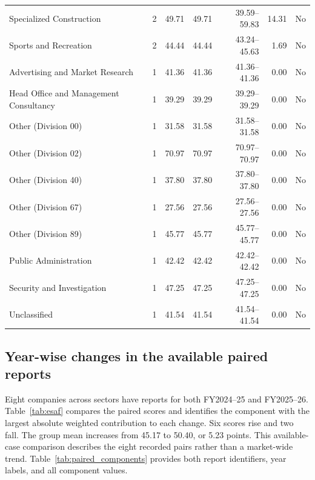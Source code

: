 {\begin{longtable}{@{}L{6.0cm}rrrrrr@{}}
Specialized Construction & 2 & 49.71 & 49.71 & 39.59--59.83 & 14.31 & No \\
Sports and Recreation & 2 & 44.44 & 44.44 & 43.24--45.63 & 1.69 & No \\
Advertising and Market Research & 1 & 41.36 & 41.36 & 41.36--41.36 & 0.00 & No \\
Head Office and Management Consultancy & 1 & 39.29 & 39.29 & 39.29--39.29 & 0.00 & No \\
Other (Division 00) & 1 & 31.58 & 31.58 & 31.58--31.58 & 0.00 & No \\
Other (Division 02) & 1 & 70.97 & 70.97 & 70.97--70.97 & 0.00 & No \\
Other (Division 40) & 1 & 37.80 & 37.80 & 37.80--37.80 & 0.00 & No \\
Other (Division 67) & 1 & 27.56 & 27.56 & 27.56--27.56 & 0.00 & No \\
Other (Division 89) & 1 & 45.77 & 45.77 & 45.77--45.77 & 0.00 & No \\
Public Administration & 1 & 42.42 & 42.42 & 42.42--42.42 & 0.00 & No \\
Security and Investigation & 1 & 47.25 & 47.25 & 47.25--47.25 & 0.00 & No \\
Unclassified & 1 & 41.54 & 41.54 & 41.54--41.54 & 0.00 & No \\
\end{longtable}}

\clearpage

\subsection{Year-wise changes in the available paired reports}
\label{sec:yearwise}

Eight companies across sectors have reports for both FY2024--25 and FY2025--26. Table~\ref{tab:esaf} compares the paired scores and identifies the component with the largest absolute weighted contribution to each change. Six scores rise and two fall. The group mean increases from 45.17 to 50.40, or 5.23 points. This available-case comparison describes the eight recorded pairs rather than a market-wide trend. Table~\ref{tab:paired_components} provides both report identifiers, year labels, and all component values.

